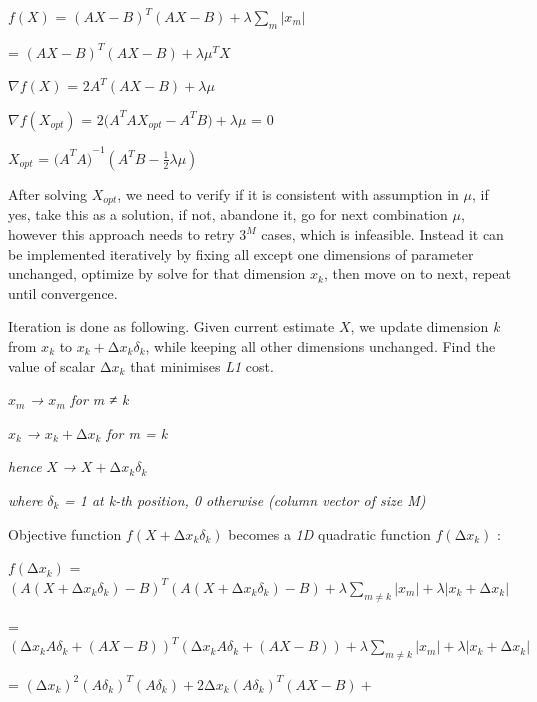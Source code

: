 \(f(X)\) =
\((AX - B)^{T}(AX - B) + \lambda\sum_{m}^{}\left| x_{m} \right|\)

= \((AX - B)^{T}(AX - B) + \lambda\mu^{T}X\)

\(\nabla f(X)\) = \({2A}^{T}(AX - B) + \lambda\mu\)

\(\nabla f\left( X_{opt} \right)\) =
\({2(A}^{T}AX_{opt} - A^{T}B) + \lambda\mu\) = \(0\)

\(X_{opt}\) = \({{(A}^{T}A)}^{- 1}(A^{T}B - \frac{1}{2}\lambda\mu)\)

After solving \(X_{opt}\), we need to verify if it is consistent with
assumption in \(\mu\), if yes, take this as a solution, if not, abandone
it, go for next combination \(\mu\), however this approach needs to
retry \(3^{M}\) cases, which is infeasible. Instead it can be
implemented iteratively by fixing all except one dimensions of parameter
unchanged, optimize by solve for that dimension \(x_{k}\), then move on
to next, repeat until convergence.

Iteration is done as following. Given current estimate \(X\), we update
dimension \emph{k} from \(x_{k}\) to
\(x_{k} + {\mathrm{\Delta}x}_{k}\delta_{k}\), while keeping all other
dimensions unchanged. Find the value of scalar
\({\mathrm{\Delta}x}_{k}\) that minimises \emph{L1} cost.

\(x_{m}\) \emph{→} \(x_{m}\) \emph{for m ≠ k}

\(x_{k}\) \emph{→} \(x_{k} + \mathrm{\Delta}x_{k}\) \emph{for m = k}

\emph{hence} \(X\) \emph{→} \(X + {\mathrm{\Delta}x}_{k}\delta_{k}\)

\emph{where} \(\delta_{k}\) \emph{= 1 at k-th position, 0 otherwise
(column vector of size M)}

Objective function
\(f\left( X + {\mathrm{\Delta}x}_{k}\delta_{k} \right)\) becomes a
\emph{1D} quadratic function \(f({\mathrm{\Delta}x}_{k})\) :

\(f\left( {\mathrm{\Delta}x}_{k} \right)\) =
\(\left( A(X + {\mathrm{\Delta}x}_{k}\delta_{k}) - B \right)^{T}\left( A(X + {\mathrm{\Delta}x}_{k}\delta_{k}) - B \right) + \lambda\sum_{m \neq k}^{}\left| x_{m} \right| + \lambda\left| x_{k} + {\mathrm{\Delta}x}_{k} \right|\)

=
\(\left( {\mathrm{\Delta}x}_{k}{A\delta}_{k} + (AX - B) \right)^{T}\left( {\mathrm{\Delta}x}_{k}{A\delta}_{k} + (AX - B) \right) + \lambda\sum_{m \neq k}^{}\left| x_{m} \right| + \lambda\left| x_{k} + {\mathrm{\Delta}x}_{k} \right|\)

=
\(\left( {\mathrm{\Delta}x}_{k} \right)^{2}\left( {A\delta}_{k} \right)^{T}\left( {A\delta}_{k} \right) + {2\mathrm{\Delta}x}_{k}\left( {A\delta}_{k} \right)^{T}(AX - B) +\)

